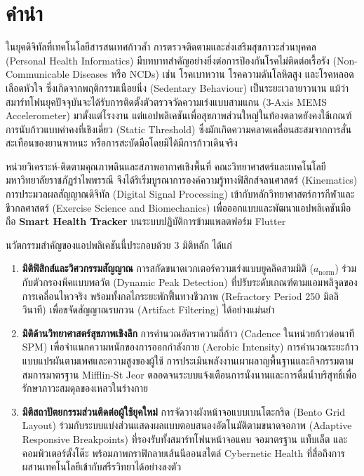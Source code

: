 \chapter*{คำนำ}

ในยุคดิจิทัลที่เทคโนโลยีสารสนเทศก้าวล้ำ การตรวจติดตามและส่งเสริมสุขภาวะส่วนบุคคล (Personal Health Informatics) มีบทบาทสำคัญอย่างยิ่งต่อการป้องกันโรคไม่ติดต่อเรื้อรัง (Non-Communicable Diseases หรือ NCDs) เช่น โรคเบาหวาน โรคความดันโลหิตสูง และโรคหลอดเลือดหัวใจ ซึ่งเกิดจากพฤติกรรมเนือยนิ่ง (Sedentary Behaviour) เป็นระยะเวลายาวนาน แม้ว่าสมาร์ทโฟนยุคปัจจุบันจะได้รับการติดตั้งตัวตรวจวัดความเร่งแบบสามแกน (3-Axis MEMS Accelerometer) มาตั้งแต่โรงงาน แต่แอปพลิเคชันเพื่อสุขภาพส่วนใหญ่ในท้องตลาดยังคงใช้เกณฑ์การนับก้าวแบบค่าคงที่เชิงเดี่ยว (Static Threshold) ซึ่งมักเกิดความคลาดเคลื่อนสะสมจากการสั่นสะเทือนของยานพาหนะ หรือการสะบัดมือโดยมิได้มีการก้าวเดินจริง

หน่วยวิเคราะห์-ติดตามคุณภาพดินและสภาพอากาศเชิงพื้นที่ คณะวิทยาศาสตร์และเทคโนโลยี มหาวิทยาลัยราชภัฏรำไพพรรณี จึงได้ริเริ่มบูรณาการองค์ความรู้ทางฟิสิกส์จลนศาสตร์ (Kinematics) การประมวลผลสัญญาณดิจิทัล (Digital Signal Processing) เข้ากับหลักวิทยาศาสตร์การกีฬาและชีวกลศาสตร์ (Exercise Science and Biomechanics) เพื่อออกแบบและพัฒนาแอปพลิเคชันมือถือ \textbf{Smart Health Tracker} บนระบบปฏิบัติการข้ามแพลตฟอร์ม Flutter

นวัตกรรมสำคัญของแอปพลิเคชันนี้ประกอบด้วย 3 มิติหลัก ได้แก่
\begin{enumerate}[label=\textbf{\arabic*.}]
  \item \textbf{มิติฟิสิกส์และวิศวกรรมสัญญาณ} การสกัดขนาดเวกเตอร์ความเร่งแบบยูคลิดสามมิติ ($a_{\text{norm}}$) ร่วมกับตัวกรองพีคแบบพลวัต (Dynamic Peak Detection) ที่ปรับระดับเกณฑ์ตามแอมพลิจูดของการเคลื่อนไหวจริง พร้อมทั้งกลไกระยะพักฟื้นทางชีวภาพ (Refractory Period 250 มิลลิวินาที) เพื่อขจัดสัญญาณรบกวน (Artifact Filtering) ได้อย่างแม่นยำ
  \item \textbf{มิติด้านวิทยาศาสตร์สุขภาพเชิงลึก} การคำนวณอัตราความถี่ก้าว (Cadence ในหน่วยก้าวต่อนาที SPM) เพื่อจำแนกความหนักของการออกกำลังกาย (Aerobic Intensity) การคำนวณระยะก้าวแบบแปรผันตามเพศและความสูงของผู้ใช้ การประเมินพลังงานเผาผลาญพื้นฐานและกิจกรรมตามสมการมาตรฐาน Mifflin-St Jeor ตลอดจนระบบแจ้งเตือนการนั่งนานและการดื่มน้ำบริสุทธิ์เพื่อรักษาภาวะสมดุลของเหลวในร่างกาย
  \item \textbf{มิติสถาปัตยกรรมส่วนติดต่อผู้ใช้ยุคใหม่} การจัดวางผังหน้าจอแบบเบนโตะกริด (Bento Grid Layout) ร่วมกับระบบแบ่งส่วนแสดงผลแบบตอบสนองอัตโนมัติตามขนาดจอภาพ (Adaptive Responsive Breakpoints) ที่รองรับทั้งสมาร์ทโฟนหน้าจอแคบ จอมาตรฐาน แท็บเล็ต และคอมพิวเตอร์ตั้งโต๊ะ พร้อมภาพกราฟิกลายเส้นนีออนสไตล์ Cybernetic Health ที่สื่อถึงการผสานเทคโนโลยีเข้ากับสรีรวิทยาได้อย่างลงตัว
\end{enumerate}

